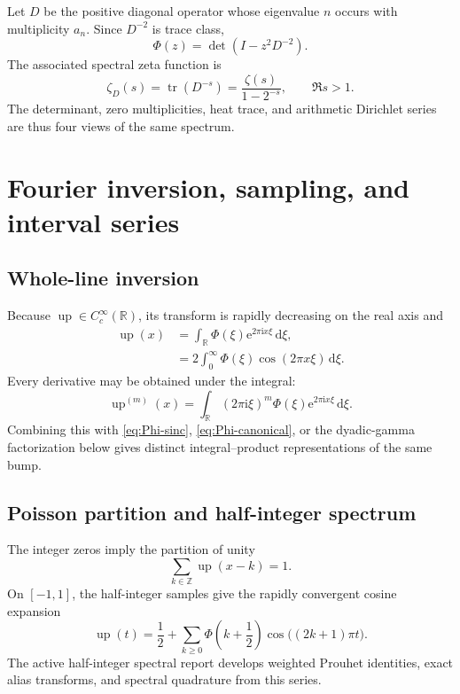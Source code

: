 \documentclass[11pt,oneside]{article}
\theoremstyle{definition}
\theoremstyle{remark}
\newcommand{\R}{\mathbb R}
\newcommand{\Z}{\mathbb Z}
\newcommand{\Up}{\operatorname{up}}
\newcommand{\e}{\mathrm e}
\newcommand{\ii}{\mathrm i}
\newcommand{\dd}{\,\mathrm d}
\begin{document}
Let $D$ be the positive diagonal operator whose eigenvalue $n$ occurs with multiplicity
$a_n$.  Since $D^{-2}$ is trace class,
\begin{equation}
 \boxed{\quad
 \Phi(z)=\det(I-z^2D^{-2}).
 \quad}                                                  \label{eq:Fredholm}
\end{equation}
The associated spectral zeta function is
\begin{equation}
 \zeta_D(s)=\operatorname{tr}(D^{-s})
 =\frac{\zeta(s)}{1-2^{-s}},\qquad \Re s>1.              \label{eq:spectral-zeta}
\end{equation}
The determinant, zero multiplicities, heat trace, and arithmetic Dirichlet series are thus
four views of the same spectrum.

\section{Fourier inversion, sampling, and interval series}
\label{sec:fourier-inversion}

\subsection{Whole-line inversion}

Because $\Up\in C_c^\infty(\R)$, its transform is rapidly decreasing on the real axis and
\begin{align}
 \Up(x)
 &=\int_{\R}\Phi(\xi)\e^{2\pi\ii x\xi}\dd\xi,           \label{eq:up-inversion}\\
 &=2\int_0^\infty\Phi(\xi)\cos(2\pi x\xi)\dd\xi.       \label{eq:up-cos-integral}
\end{align}
Every derivative may be obtained under the integral:
\begin{equation}
 \Up^{(m)}(x)=\int_{\R}(2\pi\ii\xi)^m
 \Phi(\xi)\e^{2\pi\ii x\xi}\dd\xi.                   \label{eq:up-derivative-Fourier}
\end{equation}
Combining this with \eqref{eq:Phi-sinc}, \eqref{eq:Phi-canonical}, or the dyadic-gamma
factorization below gives distinct integral--product representations of the same bump.

\subsection{Poisson partition and half-integer spectrum}

The integer zeros imply the partition of unity
\begin{equation}
 \sum_{k\in\Z}\Up(x-k)=1.                                \label{eq:partition-unity}
\end{equation}
On $[-1,1]$, the half-integer samples give the rapidly convergent cosine expansion
\begin{equation}
 \boxed{\quad
 \Up(t)=\frac12+\sum_{k\ge0}
 \Phi\left(k+\frac12\right)
 \cos\bigl((2k+1)\pi t\bigr).
 \quad}                                                  \label{eq:up-half-cosine}
\end{equation}
The active half-integer spectral report develops weighted Prouhet identities, exact alias
transforms, and spectral quadrature from this series.
\end{document}
